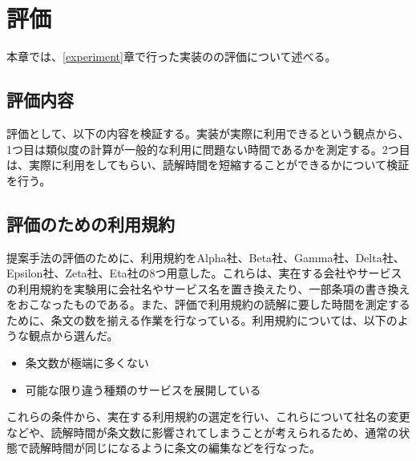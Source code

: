 \chapter{評価}
\label{discussion}
本章では、\ref{experiment}章で行った実装のの評価について述べる。

\section{評価内容}
評価として、以下の内容を検証する。実装が実際に利用できるという観点から、1つ目は類似度の計算が一般的な利用に問題ない時間であるかを測定する。2つ目は、実際に利用をしてもらい、読解時間を短縮することができるかについて検証を行う。

\section{評価のための利用規約}
\label{sec:評価のための利用規約}
提案手法の評価のために、利用規約をAlpha社、Beta社、Gamma社、Delta社、Epsilon社、Zeta社、Eta社の8つ用意した。これらは、実在する会社やサービスの利用規約を実験用に会社名やサービス名を置き換えたり、一部条項の書き換えをおこなったものである。また、評価で利用規約の読解に要した時間を測定するために、条文の数を揃える作業を行なっている。利用規約については、以下のような観点から選んだ。
\begin{itemize}
  \item 条文数が極端に多くない
  \item 可能な限り違う種類のサービスを展開している
\end{itemize}
これらの条件から、実在する利用規約の選定を行い、これらについて社名の変更などや、読解時間が条文数に影響されてしまうことが考えられるため、通常の状態で読解時間が同じになるように条文の編集などを行なった。

